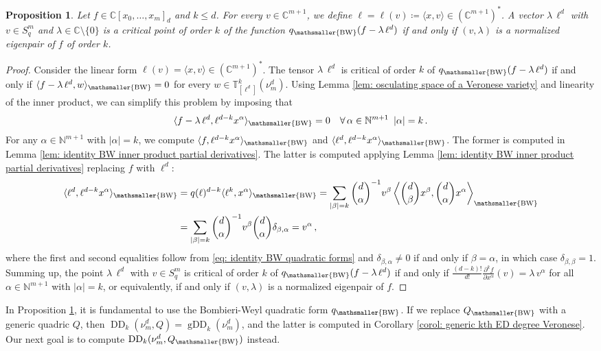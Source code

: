 \documentclass[11pt,reqno]{amsart}
\numberwithin{equation}{section}
\theoremstyle{plain}
\numberwithin{theorem}{section}
\newtheorem{proposition}[theorem]{Proposition}
\theoremstyle{definition}
\newcommand{\N}{\mathbb{N}}
\newcommand{\C}{\mathbb{C}}
\newcommand{\T}{\mathbb{T}}
\newcommand{\DD}{\operatorname{DD}}
\newcommand{\gDD}{\operatorname{gDD}}
\newcommand{\mBW}{\mathsmaller{\mathrm{BW}}}
\begin{document}
\begin{proposition}\label{prop: critical points BW distance}
Let $f\in\C[x_0,\dots,x_m]_d$ and $k\le d$. For every $v\in\C^{m+1}$, we define $\ell=\ell(v)\coloneqq\langle x,v\rangle\in(\C^{m+1})^*$. A vector $\lambda\,\ell^d$ with $v\in S_q^m$ and $\lambda\in\C\setminus\{0\}$ is a critical point of order $k$ of the function $q_\mBW(f-\lambda\,\ell^d)$ if and only if $(v,\lambda)$ is a normalized eigenpair of $f$ of order $k$.
\end{proposition}
\begin{proof}
Consider the linear form $\ell(v)=\langle x, v\rangle\in(\C^{m+1})^*$.
The tensor $\lambda\,\ell^d$ is critical of order $k$ of $q_\mBW(f-\lambda\,\ell^d)$ if and only if $\langle f-\lambda\,\ell^d, w\rangle_\mBW=0$ for every $w\in\T_{[\ell^d]}^k(\nu_m^d)$. Using Lemma \ref{lem: osculating space of a Veronese variety} and linearity of the inner product, we can simplify this problem by imposing that
\[
\langle f-\lambda\,\ell^d,\ell^{d-k}x^\alpha\rangle_\mBW=0\quad\forall\,\alpha\in\N^{m+1}\,\ |\alpha|=k\,.
\]
For any $\alpha\in\N^{m+1}$ with $|\alpha|=k$, we compute $\langle f,\ell^{d-k}x^\alpha\rangle_\mBW$ and $\langle\ell^d,\ell^{d-k}x^\alpha\rangle_\mBW$. The former is computed in  Lemma \ref{lem: identity BW inner product partial derivatives}. The latter is computed applying Lemma \ref{lem: identity BW inner product partial derivatives} replacing $f$ with $\ell^d$:
\begin{align*}
    \langle\ell^d,\ell^{d-k}x^\alpha\rangle_\mBW &= q(\ell)^{d-k}\langle\ell^k,x^\alpha\rangle_\mBW = \sum_{|\beta|=k}\binom{d}{\alpha}^{-1}v^\beta\left\langle\binom{d}{\beta}x^\beta,\binom{d}{\alpha}x^\alpha\right\rangle_\mBW\\
    &= \sum_{|\beta|=k}\binom{d}{\alpha}^{-1}v^\beta\binom{d}{\alpha}\delta_{\beta,\alpha} = v^\alpha\,,
\end{align*}
where the first and second equalities follow from \eqref{eq: identity BW quadratic forms} and $\delta_{\beta,\alpha}\neq 0$ if and only if $\beta=\alpha$, in which case $\delta_{\beta,\beta}=1$.
Summing up, the point $\lambda\,\ell^d$ with $v\in S_q^m$ is critical of order $k$ of $q_\mBW(f-\lambda\,\ell^d)$ if and only if $\frac{(d-k)!}{d!}\frac{\partial^k f}{\partial x^\alpha}(v) = \lambda\,v^\alpha$ for all $\alpha\in\N^{m+1}$ with $|\alpha|=k$, or equivalently, if and only if $(v,\lambda)$ is a normalized eigenpair of $f$.
\end{proof}

In Proposition \ref{prop: critical points BW distance}, it is fundamental to use the Bombieri-Weyl quadratic form $q_\mBW$.
If we replace $Q_\mBW$ with a generic quadric $Q$, then $\DD_k(\nu_m^d,Q)=\gDD_k(\nu_m^d)$, and the latter is computed in Corollary \ref{corol: generic kth ED degree Veronese}. Our next goal is to compute $\DD_k(\nu_m^d,Q_\mBW)$ instead.
\end{document}
